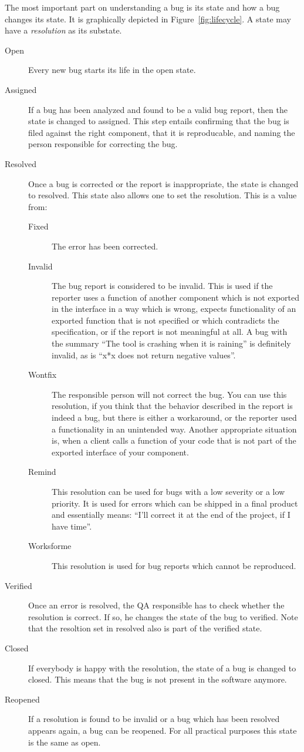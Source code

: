 \documentclass[11pt,nologo,handout]{handout}
\begin{document}
The most important part on understanding a bug is its state and how a bug
changes its state.  It is graphically depicted in
Figure~\ref{fig:lifecycle}.  A state may have a \emph{resolution} as its
substate.
\begin{description}
\item[Open]  Every new bug starts its life in the open state.
\item[Assigned]  If a bug has been analyzed and found to be a valid bug
  report, then the state is changed to assigned.  This step entails
  confirming that the bug is filed against the right component, that it
  is reproducable, and naming the person responsible for correcting the
  bug.
\item[Resolved]  Once a bug is corrected or the report is inappropriate,
  the state is changed to resolved.  This state also allows one to set
  the resolution.  This is a value from:
  \begin{description}
  \item[Fixed]  The error has been corrected.
  \item[Invalid]  The bug report is considered to be invalid.  This
    is used if the reporter uses a function of another component which
    is not exported in the interface in a way which is wrong, expects
    functionality of an exported function that is not specified or
    which contradicts the specification, or if the report is not meaningful
    at all.  A bug with the summary ``The tool is crashing when it is
    raining'' is definitely invalid, as is ``x*x does not return negative
    values''.
  \item[Wontfix]  The responsible person will not correct the bug.  You
    can use this resolution, if you think that the behavior described in
    the report is indeed a bug, but there is either a workaround, or the
    reporter used a functionality in an unintended way.  Another
    appropriate situation is, when a client calls a function of your code
    that is not part of the exported interface of your component.
  \item[Remind]  This resolution can be used for bugs with a low severity
    or a low priority.  It is used for errors which can be shipped in a
    final product and essentially means: ``I'll correct it at the end of
    the project, if I have time''.
  \item[Worksforme]  This resolution is used for bug reports which cannot
    be reproduced.
  \end{description}
\item[Verified]  Once an error is resolved, the QA responsible has to check
  whether the resolution is correct.  If so, he changes the state of the
  bug to verified.  Note that the resoltion set in resolved also is part
  of the verified state.
\item[Closed]  If everybody is happy with the resolution, the state of a
  bug is changed to closed.  This means that the bug is not present in the
  software anymore.
\item[Reopened]  If a resolution is found to be invalid or a bug which has
  been resolved appears again, a bug can be reopened.  For all practical
  purposes this state is the same as open.
\end{description}
\end{document}
